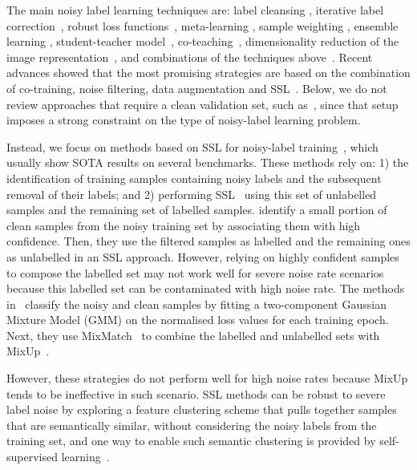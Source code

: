 \documentclass[review]{elsarticle}
\theoremstyle{plain}
\begin{document}
The main noisy label learning techniques are: 
label cleansing \citep{jaehwan2019photometric, yuan2018iterative}, 
iterative label correction~\citep{zhang2021learning}, 
robust loss functions~\citep{liu2020early, wang2019imae, wang2019symmetric}, meta-learning \citep{han2018pumpout,FaMUS,sun2021learning}, sample weighting \citep{ren2018learning}, ensemble learning \citep{miao2015rboost}, student-teacher model~\citep{tarvainen2017mean}, co-teaching~\citep{li2020dividemix,jiang2018mentornet,malach2017decoupling,han2018co,yu2019does}, dimensionality reduction of the image representation~\citep{ma2018dimensionality}, 
and combinations of the techniques above~\citep{yu2018learning, kim2019nlnl, zhang2019metacleaner,SELF,jiang2020beyond}. 
Recent advances showed that the most promising strategies are based on the combination of co-training, noise filtering, data augmentation and SSL~\citep{li2020dividemix,ortego2019towards,ortego2020multi}. 
Below, we do not review approaches that require a clean validation set, such as~\citep{zhang2020distilling}, since that setup imposes a strong constraint on the type of noisy-label learning problem.

Instead, we focus on methods based on SSL for noisy-label training~\citep{ding2018semi,ortego2019towards,li2020dividemix,ortego2020multi,sachdeva2021evidentialmix,cordeiro2021longremix}, which usually show SOTA results on several benchmarks.  These methods rely on: 1) the identification of training samples containing noisy labels and the subsequent removal of their labels; and 2) performing SSL~\citep{MixMatch} using this set of unlabelled samples and the remaining set of labelled samples.
\citep{ding2018semi} identify a small portion of clean samples from the noisy training set by associating them with high confidence. Then, they use the filtered samples as labelled and the remaining ones as unlabelled in an SSL approach. However, relying on highly confident samples to compose the labelled set may not work well for severe noise rate scenarios because this labelled set can be contaminated with high noise rate.
The methods in~\citep{li2020dividemix,ortego2019towards} classify the noisy and clean samples by fitting a two-component Gaussian Mixture Model (GMM) on the normalised loss values for each training epoch. Next, they use  MixMatch~\citep{MixMatch} to combine the labelled and unlabelled sets with MixUp~\citep{zhang2017mixup}. 

However, these strategies do not perform well for high noise rates because MixUp tends to be ineffective in such scenario.
SSL methods can be robust to severe label noise by exploring a feature clustering scheme that pulls together samples that are semantically similar, without considering the noisy labels from the training set, and one way to enable such semantic clustering is provided by self-supervised learning~\citep{SimCLR,MoCo,MoCoV2,SCAN}.
\end{document}
